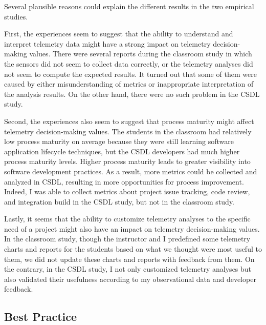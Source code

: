 Several plausible reasons could explain the different results in the two empirical studies. 

First, the experiences seem to suggest that the ability to understand and interpret telemetry data might have a strong impact on telemetry decision-making values. There were several reports during the classroom study in which the sensors did not seem to collect data correctly, or the telemetry analyses did not seem to compute the expected results. It turned out that some of them were caused by either misunderstanding of metrics or inappropriate interpretation of the analysis results. On the other hand, there were no such problem in the CSDL study.

Second, the experiences also seem to suggest that process maturity might affect telemetry decision-making values. The students in the classroom had relatively low process maturity on average because they were still learning software application lifecycle techniques, but the CSDL developers had much higher process maturity levels. Higher process maturity leads to greater visibility into software development practices. As a result, more metrics could be collected and analyzed in CSDL, resulting in more opportunities for process improvement. Indeed, I was able to collect metrics about project issue tracking, code review, and integration build in the CSDL study, but not in the classroom study. 

Lastly, it seems that the ability to customize telemetry analyses to the specific need of a project might also have an impact on telemetry decision-making values. In the classroom study, though the instructor and I predefined some telemetry charts and reports for the students based on what we thought were most useful to them, we did not update these charts and reports with feedback from them. On the contrary, in the CSDL study, I not only customized telemetry analyses but also validated their usefulness according to my observational data and developer feedback.







\subsection{Best Practice}

